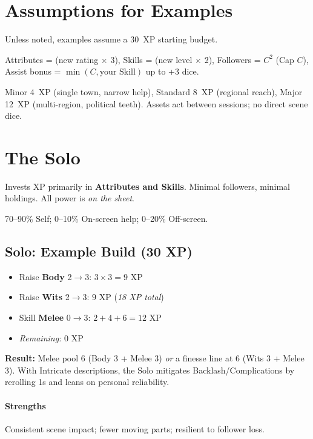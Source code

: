 \documentclass[12pt]{book}
\begin{document}
\section{Assumptions for Examples}
Unless noted, examples assume a 30~XP starting budget.
\begin{description}[leftmargin=2cm]
  \item[Costs:] Attributes = (new rating $\times$ 3), Skills = (new level $\times$ 2), Followers = $C^2$ (Cap $C$), Assist bonus = $\min(C,\text{your Skill})$ up to +3 dice.
  \item[Off-Screen Assets:] Minor 4~XP (single town, narrow help), Standard 8~XP (regional reach), Major 12~XP (multi-region, political teeth). Assets act between sessions; no direct scene dice.
\end{description}

\section{The Solo}
\begin{description}[leftmargin=2cm]
  \item[Definition:] Invests XP primarily in \textbf{Attributes and Skills}. Minimal followers, minimal holdings. All power is \emph{on the sheet}.
  \item[Typical XP Spread:] 70--90\% Self; 0--10\% On-screen help; 0--20\% Off-screen.
\end{description}

\subsection*{Solo: Example Build (30 XP)}
\begin{itemize}
  \item Raise \textbf{Body} 2$\rightarrow$3: $3\times 3=9$ XP
  \item Raise \textbf{Wits} 2$\rightarrow$3: $9$ XP \hfill (\emph{18 XP total})
  \item Skill \textbf{Melee} 0$\rightarrow$3: $2+4+6=12$ XP
  \item \emph{Remaining:} 0 XP
\end{itemize}
\textbf{Result:} Melee pool 6 (Body 3 + Melee 3) \emph{or} a finesse line at 6 (Wits 3 + Melee 3). With Intricate descriptions, the Solo mitigates Backlash/Complications by rerolling 1s and leans on personal reliability.

\paragraph{Strengths} Consistent scene impact; fewer moving parts; resilient to follower loss.  
\end{document}
